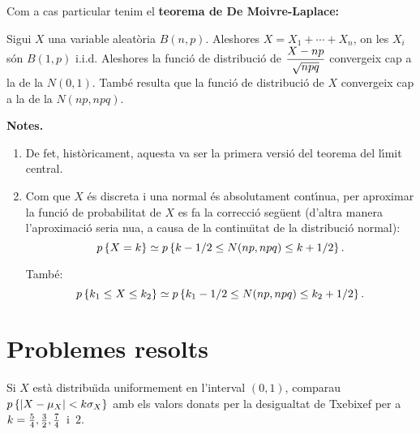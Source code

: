 Com a cas particular tenim el {\bf teorema de De Moivre-Laplace:}

Sigui $X$ una variable aleat\`oria $B(n,p)$. Aleshores $X = X_1 + \cdots + X_n$,
on les $X_i$ s\'on $B(1,p)$ i.i.d. Aleshores la funci\'o de distribuci\'o de
$\displaystyle {X - np \over \sqrt{npq}}$ convergeix cap a la de la $N(0,1)$.
Tamb\'e resulta que la funci\'o de distribuci\'o de $X$ convergeix cap a la de la
$N(np,npq)$.

{\bf Notes.}

\begin{enumerate}

\item De fet, hist\`oricament, aquesta va ser la primera versi\'o del teorema del l\'{\i}mit central.

\item Com que $X$ \'es discreta i una normal \'es absolutament cont\'{\i}nua, per aproximar la
funci\'o de probabilitat de $X$ es fa la correcci\'o seg\"uent (d'altra manera
l'aproximaci\'o seria nu{\lgem}a, a causa de la continu\"{\i}tat 
de la distribuci\'o normal):
$$p\left\{X = k\right\} \simeq p\left\{k - 1/2 \leq N(np,npq) \leq k + 1/2\right\}.$$

Tamb\'e:
$$
p\left\{k_1 \leq X \leq k_2\right\} \simeq p\left\{k_1 - 1/2 \leq N(np,npq) \leq k_2 + 1/2\right\}.
$$
\end{enumerate}

\section{Problemes resolts}

\begin{probres}
{Si $X$ est\`a distribu\"{\i}da uniformement en l'interval $(0,1)$, comparau
\mbox{$p\left\{\vert X-\mu_X\vert <k \sigma_X\right\}$} amb els valors donats per la
desigualtat de Txebixef per a \mbox{$k={5\over 4},{3\over 2},{7\over 4}$ 
i $2$.}}
\end{probres}


